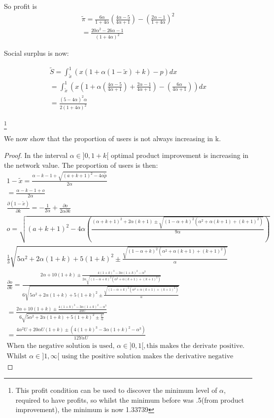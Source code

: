 \documentclass{article}
\begin{document}
So profit is 
\begin{align*}
\tilde{\pi} =
\frac{6\alpha}{1+4\alpha}\left(\frac{4\alpha-5}{4\alpha+1}\right)
-\left(\frac{2\alpha-1}{1+4\alpha} \right)^2 \\
=\frac{20 \alpha^2-26\alpha-1}{(1+4\alpha)^2} 
\end{align*}

Social surplus is now:

\begin{align*}
\tilde{S}=\int_{\tilde{x}}^1(x(1+\alpha(1-\tilde{x})+k)-p)dx 
\\
=\int_{\tilde{x}}^1(x(1+\alpha\left(\frac{4\alpha-5}{4\alpha+1}\right)+\frac{2\alpha-1}{4\alpha+1})-\left(\frac{6\alpha}{4\alpha+1}\right))dx
\\
=\frac{(5-4\alpha)^2\alpha}{2(1+4\alpha)^2}
\end{align*}

\footnote{This profit condition can be used to discover the minimum level of $\alpha$,  required to have profits, so whilst the minimum before was .5(from product improvement), the minimum is now 1.33739}

We now show that the proportion of users is not always increasing in k. 

\begin{proof}
In the interval $\alpha \in ]0,1+k[$ optimal product improvement is increasing in the network value. 
The proportion of users is then:
\begin{align*}
1-\tilde{x} = \frac{\alpha-k-1+\sqrt{(a+k+1)^2-4\alpha \tilde{p}}}{2\alpha} \\
= \frac{\alpha-k-1+o}{2\alpha}
\\
\frac{\partial (1-\tilde{x})}{\partial k} = -\frac{1}{2 \alpha} + \frac{\partial o}{2 \alpha \partial k}
\\
o = \sqrt{(a+k+1)^2-4\alpha \left(\frac{(\alpha+k+1)^2+2\alpha(k+1)\pm \sqrt{(1-\alpha+k)^2(\alpha^2+\alpha (k+1)+(k+1)^2)}}{9 \alpha} \right)}
\\
\frac{1}{3}\sqrt{5\alpha^2+2\alpha(1+k)+5(1+k)^2 \pm \frac{\sqrt{(1-\alpha+k)^2(\alpha^2+\alpha (k+1)+(k+1)^2)}}{\alpha}} 
\\
\frac{\partial o }{\partial k}=\frac{2 \alpha + 10(1+k) \pm \frac{4(1+k)^3-3\alpha(1+k)^2-\alpha^3}{2\alpha\sqrt{(1-\alpha+k)^2(\alpha^2+\alpha (k+1)+(k+1)^2)}}}{6\sqrt{5\alpha^2+2\alpha(1+k)+5(1+k)^2 \pm \frac{\sqrt{(1-\alpha+k)^2(\alpha^2+\alpha (k+1)+(k+1)^2)}}{\alpha}}} 
\\
=\frac{2 \alpha + 10(1+k) \pm \frac{4(1+k)^3-3\alpha(1+k)^2-\alpha^3}{2\alpha U }}{6\sqrt{5\alpha^2+2\alpha(1+k)+5(1+k)^2 \pm \frac{U}{\alpha}}} 
\\
=\frac{4 \alpha^2 U + 20\alpha U(1+k) \pm (4(1+k)^3-3\alpha(1+k)^2-\alpha^3 )}{12 Y \alpha U} 
\\
\text{When the negative solution is used, } \alpha \in ]0,1[, \text{this makes the derivate positive.} 
\\
\text{Whilst } \alpha \in ]1,\infty[ \text{ using the positive solution makes the derivative negative} 
\end{align*}
\end{proof}
\end{document}
